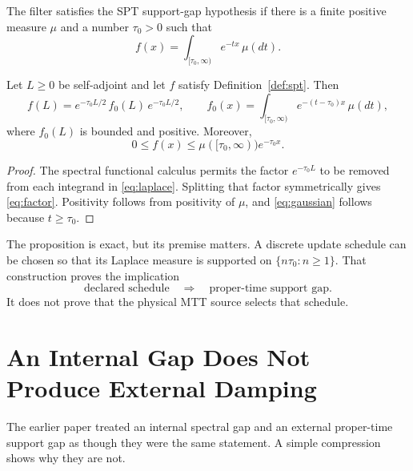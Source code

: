 \documentclass[11pt]{article}
\begin{document}
\begin{definition}
\label{def:spt}
The filter satisfies the SPT support-gap hypothesis if there is a finite
positive measure \(\mu\) and a number \(\tau_0>0\) such that
\begin{equation}
 f(x)=\int_{[\tau_0,\infty)}e^{-tx}\,\mu(dt).
 \label{eq:laplace}
\end{equation}
\end{definition}

\begin{proposition}
\label{prop:factor}
Let \(L\geq0\) be self-adjoint and let \(f\) satisfy
Definition~\ref{def:spt}. Then
\begin{equation}
 f(L)=e^{-\tau_0L/2}\,f_0(L)\,e^{-\tau_0L/2},
 \qquad
 f_0(x)=\int_{[\tau_0,\infty)}e^{-(t-\tau_0)x}\,\mu(dt),
 \label{eq:factor}
\end{equation}
where \(f_0(L)\) is bounded and positive. Moreover,
\begin{equation}
 0\leq f(x)\leq \mu([\tau_0,\infty))e^{-\tau_0x}.
 \label{eq:gaussian}
\end{equation}
\end{proposition}

\begin{proof}
The spectral functional calculus permits the factor
\(e^{-\tau_0L}\) to be removed from each integrand in
\eqref{eq:laplace}. Splitting that factor symmetrically gives
\eqref{eq:factor}. Positivity follows from positivity of \(\mu\), and
\eqref{eq:gaussian} follows because \(t\geq\tau_0\).
\end{proof}

The proposition is exact, but its premise matters. A discrete update
schedule can be chosen so that its Laplace measure is supported on
\(\{n\tau_0:n\geq1\}\). That construction proves the implication
\[
 \text{declared schedule}\quad\Longrightarrow\quad
 \text{proper-time support gap}.
\]
It does not prove that the physical MTT source selects that schedule.

\section{An Internal Gap Does Not Produce External Damping}

The earlier paper treated an internal spectral gap and an external
proper-time support gap as though they were the same statement. A simple
compression shows why they are not.
\end{document}
